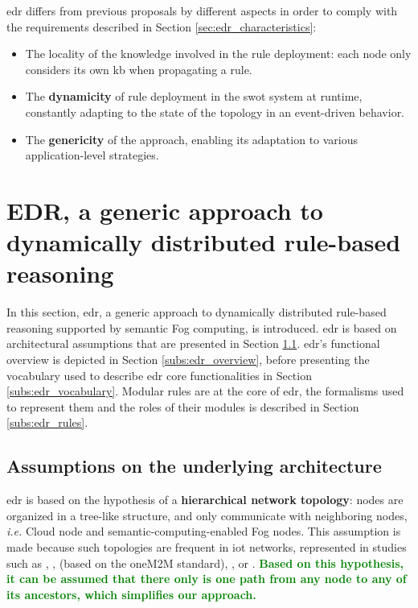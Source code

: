 \documentclass{iosart2c}
\newcommand{\added}[1]{\textcolor{green}{\textbf{#1}}}
\begin{document}
\gls{edr} differs from previous proposals by different aspects in order to comply with the requirements described in Section \textsection \ref{sec:edr_characteristics}:
\begin{itemize}
	\item The locality of the knowledge involved in the rule deployment: each node only considers its own \gls{kb} when propagating a rule.
	\item The \textbf{dynamicity} of rule deployment in the \gls{swot} system at runtime, constantly adapting to the state of the topology in an event-driven behavior.
	\item The \textbf{genericity} of the approach, enabling its adaptation to various application-level strategies.
\end{itemize} 

\section[Distributing reasoning with EDR]{EDR, a generic approach to dynamically distributed rule-based reasoning}
\label{sec:edr}

In this section, \gls{edr}, a generic approach to dynamically distributed rule-based reasoning supported by semantic Fog computing, is introduced. 
\gls{edr} is based on architectural assumptions that are presented in Section \textsection \ref{subs:edr_asumptions}.
\gls{edr}'s functional overview is depicted in Section \textsection \ref{subs:edr_overview}, before presenting the vocabulary used to describe \gls{edr} core functionalities in Section \textsection \ref{subs:edr_vocabulary}.
Modular rules are at the core of \gls{edr}, the formalisms used to represent them and the roles of their modules is described in Section \textsection \ref{subs:edr_rules}.

\subsection{Assumptions on the underlying architecture}
\label{subs:edr_asumptions}

\gls{edr} is based on the hypothesis of a \textbf{hierarchical network topology}: nodes are organized in a tree-like structure, and only communicate with neighboring nodes, \textit{i.e.} Cloud node and semantic-computing-enabled Fog nodes. 
This assumption is made because such topologies are frequent in \gls{iot} networks, represented in studies such as \cite{Rodriguez2010}, \cite{Zanella2014}, \cite{Alaya2015} (based on the oneM2M standard), \cite{Szilagyi2016}, or \cite{Su2018}.
\added{Based on this hypothesis, it can be assumed that there only is one path from any node to any of its ancestors, which simplifies our approach.}
\end{document}
